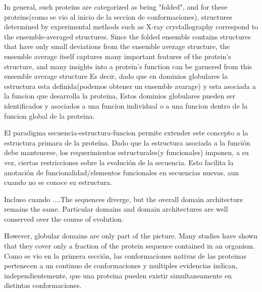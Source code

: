 In general, such proteins are categorized as being "folded", and for these proteins(como se vio al inicio de la seccion de conformaciones), 
structures determined by experimental methods such as X-ray crystallography correspond to the ensemble-averaged structures.
Since the folded ensemble contains structures that have only small deviations from the ensemble average structure, 
the ensemble average itself captures many important features of the protein's structure, and many insights into a protein's function can be garnered from this
ensemble average structure
Es decir, dado que en dominios globulares la estructura esta definida(podemos obtener un ensemble avarage) y esta asociada a la funcion que desarrolla la proteina, 
Estos dominios globulares pueden ser identificados y asociados a una funcion individual o a una funcion dentro de la funcion global de la proteina.

El paradigma secuencia-estructura-funcion permite extender este concepto a la estructura primara de la proteína.
Dado que la estructura asociada a la función debe mantenerse, los requerimientos estructurales(y funcionales) imponen, a su vez, ciertas restricciones sobre la evolución de la secuencia.
Esto facilita la anotación de funcionalidad/elementos funcionales en secuencias nuevas, aun cuando no se conoce su estructura.

Incluso cuando ....The sequences diverge, but the overall domain architecture remains the same.
Particular domains and domain architectures are well conserved over the course of evolution. 









However, globular domains are only part of the picture. 
Many studies have shown that they cover only a fraction of the protein sequence contained in an organism. 
Como se vio en la primera sección, las conformaciones nativas de las proteinas pertenecen a un continuo de conformaciones y multiples evidencias indican, independientemente, 
que una proteina pueden existir simultaneamente en distintas conformaciones.




